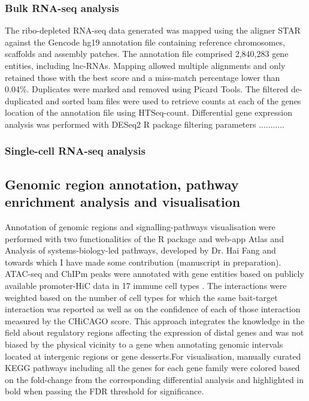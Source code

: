 \subsubsection{Bulk RNA-seq analysis}
The ribo-depleted RNA-seq data generated was mapped using the aligner STAR \parencite{Dobin2013} against the Gencode hg19 annotation file containing reference chromosomes, scaffolds and assembly patches. The annotation file comprised 2,840,283 gene entities, including lnc-RNAs. Mapping allowed multiple alignments and only retained those with the best score and a miss-match percentage lower than 0.04\%. Duplicates were marked and removed using Picard Tools. The filtered de-duplicated and sorted bam files were used to retrieve counts at each of the genes location of the annotation file using HTSeq-count. Differential gene expression analysis was performed with DESeq2 R package filtering parameters ...........





\subsubsection{Single-cell RNA-seq analysis}

\subsection{Genomic region annotation, pathway enrichment analysis and visualisation}
Annotation of genomic regions and signalling-pathways visualisation were performed with two functionalities of the R package and web-app Atlas and Analysis of systems-biology-led pathways, developed by Dr. Hai Fang and towards which I have made some contribution (manuscript in preparation). ATAC-seq and ChIPm peaks were annotated with gene entities based on publicly available promoter-HiC data in 17 immune cell types \parencite{Javierre2016}. The interactions were weighted based on the number of cell types for which the same bait-target interaction was reported as well as on the confidence of each of those interaction measured by the CHiCAGO score. This approach integrates the knowledge in the field about regulatory regions affecting the expression of distal genes and was not biased by the physical vicinity to a gene when annotating genomic intervals located at intergenic regions or gene desserts.For visualisation, manually curated KEGG pathways including all the genes for each gene family were colored based on the fold-change from the corresponding differential analysis and highlighted in bold when passing the FDR threshold for significance.

